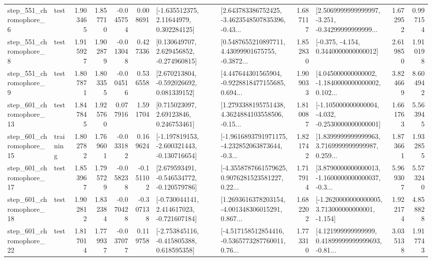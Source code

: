 \begin{tabular}{llrrrrllrlrr}
   step\_551\_chromophore\_6 &      test &      1.903465 &    1.857710 &     -0.045754 &  0.008691 &     [-1.635512375, 2.11644979, 0.302284125] &  [2.643783386752425, -3.4623548507835396, -0.43... &       1.687117 &  [2.5069999999999997, -3.251, -0.34299999999999... &            1.672952 &          0.997154 \\
   step\_551\_chromophore\_8 &      test &      1.915927 &    1.902879 &     -0.013048 &  0.427336 &    [0.130649707, 2.629456852, -0.274960815] &  [0.5487655210897711, 4.43099901675755, -0.3872... &       1.852830 &               [-0.375, -4.154, 0.3440000000000012] &            2.619850 &          1.910198 \\
   step\_551\_chromophore\_9 &      test &      1.807871 &    1.803355 &     -0.004516 &  0.536558 &    [2.670213804, -0.592026692, 0.081339152] &  [4.447644301565904, -0.9228818477155685, 0.694... &       1.909033 &  [4.045000000000002, -1.1840000000000002, 0.102... &            3.824669 &          8.604942 \\
  step\_601\_chromophore\_13 &      test &      1.847845 &    1.925760 &      0.077916 &  1.591704 &      [0.715023097, 2.69123846, 0.246753461] &  [1.2793388195751438, 4.3624884103558506, -0.15... &       1.810087 &  [-1.105000000000004, -4.032, -0.2530000000000001] &            1.661763 &          5.563945 \\
  step\_601\_chromophore\_15 &  training &      1.802782 &    1.769601 &     -0.033182 &  0.169624 &  [-1.197819153, -2.600321443, -0.130716654] &  [-1.9616893791971175, -4.232852063873644, -0.3... &       1.821742 &  [1.8399999999999963, 3.7169999999999987, 0.259... &            1.873661 &          1.932855 \\
  step\_601\_chromophore\_17 &      test &      1.853967 &    1.795729 &     -0.058238 & -0.151102 &   [2.679593491, -0.546534772, -0.120579786] &  [-4.3558787661579625, 0.9076281523581227, 0.22... &       1.717914 &  [3.8790000000000013, -1.1600000000000037, -0.3... &            5.969307 &          5.573240 \\
  step\_601\_chromophore\_18 &      test &      1.902812 &    1.832384 &     -0.070428 & -0.307138 &   [-0.730044141, 2.414617023, -0.721607184] &  [1.2693616378203154, -4.001348306015291, 0.867... &       1.682202 &   [-1.2620000000000005, 3.713000000000001, -1.154] &            1.922174 &          4.858828 \\
  step\_601\_chromophore\_22 &      test &      1.817014 &    1.779937 &     -0.037077 &  0.119758 &   [-2.753845116, -0.415805388, 0.618595358] &  [-4.517158512854416, -0.5365773287760011, 0.76... &       1.773310 &  [4.121999999999999, 0.41899999999999693, -0.81... &            3.035138 &          1.917743 \\

\end{tabular}
